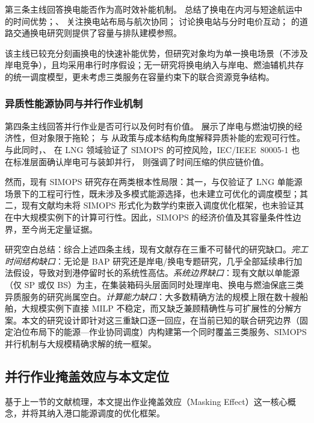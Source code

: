 \documentclass[UTF8, a4paper, 12pt]{ctexart}
\theoremstyle{plain}
\theoremstyle{definition}
\theoremstyle{remark}
\begin{document}
第三条主线回答换电能否作为高时效补能机制。\citet{Zhang2022_EShip} 总结了换电在内河与短途航运中的时间优势；\citet{Bei2024}、\citet{Zhang2024_Voyage} 关注换电站布局与航次协同；\citet{Li2022_BSS} 讨论换电站与分时电价互动；\citet{Mak2013} 的道路交通换电研究则提供了容量与排队建模参照。
 
该主线已较充分刻画换电的快速补能优势，但研究对象均为单一换电场景（不涉及岸电竞争），且均采用串行时序假设；无一研究将换电纳入与岸电、燃油辅机共存的统一调度模型，更未考虑三类服务在容量约束下的联合资源竞争结构。
 
\subsubsection{异质性能源协同与并行作业机制}
 
第四条主线回答并行作业是否可行以及何时有价值。\citet{Zhen2022_SP} 展示了岸电与燃油切换的经济性，但对象限于拖轮；\citet{Psaraftis2016} 与 \citet{Wang2023} 从政策与成本结构角度解释异质补能的宏观可行性。与此同时，\citet{Fan2021}、\citet{Fan2022_SIMOPS} 在 LNG 领域验证了 SIMOPS 的可控风险，IEC/IEEE~80005-1 \cite{IEC80005} 也在标准层面确认岸电可与装卸并行，\citet{Notteboom2006} 则强调了时间压缩的供应链价值。
 
然而，现有 SIMOPS 研究存在两类根本性局限：其一，\citet{Fan2021}与\citet{Fan2022_SIMOPS}仅验证了 LNG 单能源场景下的工程可行性，既未涉及多模式能源选择，也未建立可优化的调度模型；其二，现有文献均未将 SIMOPS 形式化为数学约束嵌入调度优化框架，也未验证其在中大规模实例下的计算可行性。因此，SIMOPS 的经济价值及其容量条件性边界，至今尚无定量证据。
 
研究空白总结：综合上述四条主线，现有文献存在三重不可替代的研究缺口。\emph{完工时间结构缺口}：无论是 BAP 研究还是岸电/换电专题研究，几乎全部延续串行加法假设，导致对到港停留时长的系统性高估。\emph{系统边界缺口}：现有文献以单能源（仅 SP 或仅 BS）为主，在集装箱码头层面同时处理岸电、换电与燃油保底三类异质服务的研究尚属空白。\emph{计算能力缺口}：大多数精确方法的规模上限在数十艘船舶，大规模实例下直接 MILP 不稳定，而又缺乏兼顾精确性与可扩展性的分解方案。本文的研究设计即针对这三重缺口逐一回应，在当前已知的联合研究边界（固定泊位布局下的能源—作业协同调度）内构建第一个同时覆盖三类服务、SIMOPS 并行机制与大规模精确求解的统一框架。
\subsection{并行作业掩盖效应与本文定位}
 
基于上一节的文献梳理，本文提出作业掩盖效应（Masking Effect）这一核心概念，并将其纳入港口能源调度的优化框架。
 
\end{document}
